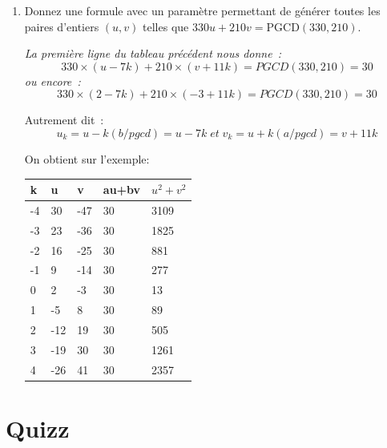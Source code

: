 \documentclass[11pt]{article}
\begin{document}
\begin{enumerate}
\item Donnez une formule avec un paramètre permettant de générer toutes les paires d'entiers  $(u, v)$ telles
que $330u+210v=\mbox{PGCD}(330, 210)$.

{\it 
La première ligne du tableau précédent nous donne~:
$$330 \times (u-7k) + 210\times (v+11k) = PGCD(330, 210)=30 $$
ou encore~:
$$330 \times (2-7k) + 210\times (-3+11k) = PGCD(330, 210)=30 $$

Autrement dit~: 
$$u_k=u-k(b/pgcd)=u-7k\;  et \; v_k=u+k(a/pgcd)=v+11k$$

On obtient sur l'exemple:
}


\medskip
\begin{tabular}{|p{2cm}|p{2cm}|p{2cm}||p{2cm}|p{2cm}|}
\hline k & u & v & au+bv & $u^2+v^2$\\ 
\hline -4 & 30 & -47 & 30 & 3109\\ 
\hline -3 & 23 & -36 & 30 & 1825\\ 
\hline -2 & 16 & -25 & 30 & 881\\ 
\hline -1 & 9 & -14 & 30 & 277\\ 
\hline 0 & 2 & -3 & 30 & 13\\ 
\hline 1 & -5 & 8 & 30 & 89\\ 
\hline 2 & -12 & 19 & 30 & 505\\  
\hline 3 & -19 & 30 & 30 & 1261\\ 
\hline 4 & -26 & 41 & 30 & 2357\\ 
\hline
\end{tabular}

\end{enumerate}



\section{Quizz}
\end{document}
